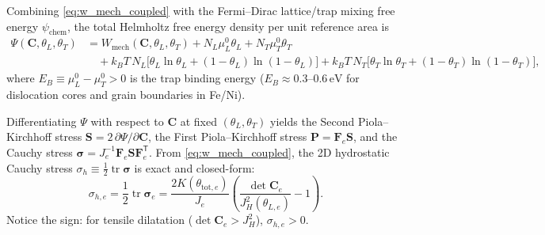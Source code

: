\documentclass[11pt,a4paper]{article}
\newcommand{\T}{^{\mathsf T}}
\newcommand{\tr}{\operatorname{tr}}
\begin{document}
Combining \eqref{eq:w_mech_coupled} with the Fermi--Dirac lattice/trap mixing free energy $\psi_{\text{chem}}$, the total Helmholtz free energy density per unit reference area is
\begin{align}
  \Psi(\mathbf{C}, \theta_L, \theta_T)
  &= W_{\text{mech}}(\mathbf{C}, \theta_L, \theta_T)
   + N_L \mu_L^0 \theta_L + N_T \mu_T^0 \theta_T \nonumber\\
  &\quad + k_B T\, N_L \bigl[\theta_L \ln \theta_L + (1 - \theta_L)\ln(1 - \theta_L)\bigr]
   + k_B T\, N_T \bigl[\theta_T \ln \theta_T + (1 - \theta_T)\ln(1 - \theta_T)\bigr],
  \label{eq:total_psi}
\end{align}
where $E_B \equiv \mu_L^0 - \mu_T^0 > 0$ is the trap binding energy ($E_B \approx 0.3\text{--}0.6\,\mathrm{eV}$ for dislocation cores and grain boundaries in Fe/Ni).

Differentiating $\Psi$ with respect to $\mathbf{C}$ at fixed $(\theta_L, \theta_T)$ yields the Second Piola--Kirchhoff stress $\mathbf{S} = 2\,\partial \Psi / \partial \mathbf{C}$, the First Piola--Kirchhoff stress $\mathbf{P} = \mathbf{F}_e \mathbf{S}$, and the Cauchy stress $\boldsymbol{\sigma} = J_e^{-1}\mathbf{F}_e \mathbf{S} \mathbf{F}_e\T$. From \eqref{eq:w_mech_coupled}, the 2D hydrostatic Cauchy stress $\sigma_h \equiv \frac{1}{2}\tr\boldsymbol{\sigma}$ is exact and closed-form:
\begin{equation}
  \sigma_{h,e} = \frac{1}{2}\tr\boldsymbol{\sigma}_e
  = \frac{2K(\theta_{\text{tot},e})}{J_e}\left(\frac{\det\mathbf{C}_e}{J_H^2(\theta_{L,e})} - 1\right).
  \label{eq:sigma_h}
\end{equation}
Notice the sign: for tensile dilatation ($\det\mathbf{C}_e > J_H^2$), $\sigma_{h,e} > 0$.
\end{document}
